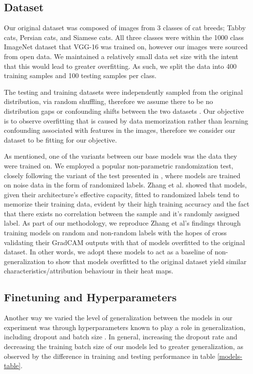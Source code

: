 \documentclass[conference]{IEEEtran}
\begin{document}
\subsection{Dataset}
Our original dataset was composed of images from 3 classes of cat breeds; Tabby cats, Persian cats, and Siamese cats. All three classes were within the 1000 class ImageNet dataset that VGG-16 was trained on, however our images were sourced from open data. We maintained a relatively small data set size with the intent that this would lead to greater overfitting. As such, we split the data into 400 training samples and 100 testing samples per class. 

The testing and training datasets were independently sampled from the original distribution, via random shuffling, therefore we assume there to be no distribution gaps or confounding shifts between the two datasets \cite{invariant}. Our objective is to observe overfitting that is caused by data memorization rather than learning confounding associated with features in the images, therefore we consider our dataset to be fitting for our objective. 

As mentioned, one of the variants between our base models was the data they were trained on. We employed a popular non-parametric randomization test, closely following the variant of the test presented in \cite{generalize}, where models are trained on noise data in the form of randomized labels. 
Zhang et al. showed that models, given their architecture's effective capacity, fitted to randomized labels tend to memorize their training data, evident by their high training accuracy and the fact that there exists no correlation between the sample and it's randomly assigned label. As part of our methodology, we reproduce Zhang et al's findings through training models on random and non-random labels with the hopes of cross validating their GradCAM outputs with that of models overfitted to the original dataset. In other words, we adopt these models to act as a baseline of non-generalization to show that models overfitted to the original dataset yield similar characteristics/attribution behaviour in their heat maps. 

\subsection{Finetuning and Hyperparameters}
Another way we varied the level of generalization between the models in our experiment was through hyperparameters known to play a role in generalization, including dropout \cite{dropout} and batch size \cite{batchsize}. In general, increasing the dropout rate and decreasing the training batch size of our models led to greater generalization, as observed by the difference in training and testing performance in table \ref{models-table}.
\end{document}
